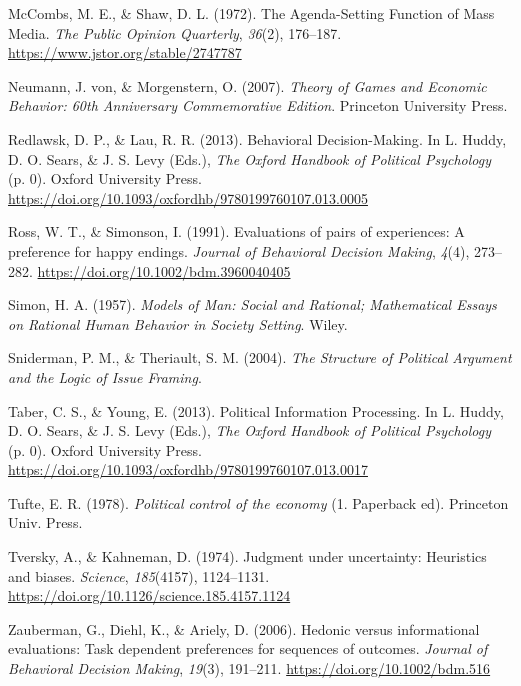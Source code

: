 \documentclass[
]{article}
\newlength{\cslhangindent}
\newlength{\cslentryspacingunit} %
\newenvironment{CSLReferences}[2] %
 {%
  \setlength{\parindent}{0pt}
  \ifodd #1
  \let\oldpar\par
  \def\par{\hangindent=\cslhangindent\oldpar}
  \fi
  \setlength{\parskip}{#2\cslentryspacingunit}
 }%
 {}
\begin{document}
\begin{CSLReferences}{1}{0}
\leavevmode{}%
McCombs, M. E., \& Shaw, D. L. (1972). The {Agenda-Setting Function} of
{Mass Media}. \emph{The Public Opinion Quarterly}, \emph{36}(2),
176--187. \url{https://www.jstor.org/stable/2747787}

\leavevmode{}%
Neumann, J. von, \& Morgenstern, O. (2007). \emph{Theory of {Games} and
{Economic Behavior}: 60th {Anniversary Commemorative Edition}}.
{Princeton University Press}.

\leavevmode{}%
Redlawsk, D. P., \& Lau, R. R. (2013). Behavioral {Decision-Making}. In
L. Huddy, D. O. Sears, \& J. S. Levy (Eds.), \emph{The {Oxford Handbook}
of {Political Psychology}} (p. 0). {Oxford University Press}.
\url{https://doi.org/10.1093/oxfordhb/9780199760107.013.0005}

\leavevmode{}%
Ross, W. T., \& Simonson, I. (1991). Evaluations of pairs of
experiences: {A} preference for happy endings. \emph{Journal of
Behavioral Decision Making}, \emph{4}(4), 273--282.
\url{https://doi.org/10.1002/bdm.3960040405}

\leavevmode{}%
Simon, H. A. (1957). \emph{Models of {Man}: {Social} and {Rational};
{Mathematical Essays} on {Rational Human Behavior} in {Society
Setting}}. {Wiley}.

\leavevmode{}%
Sniderman, P. M., \& Theriault, S. M. (2004). \emph{The {Structure} of
{Political Argument} and the {Logic} of {Issue Framing}}.

\leavevmode{}%
Taber, C. S., \& Young, E. (2013). Political {Information Processing}.
In L. Huddy, D. O. Sears, \& J. S. Levy (Eds.), \emph{The {Oxford
Handbook} of {Political Psychology}} (p. 0). {Oxford University Press}.
\url{https://doi.org/10.1093/oxfordhb/9780199760107.013.0017}

\leavevmode{}%
Tufte, E. R. (1978). \emph{Political control of the economy} (1.
Paperback ed). {Princeton Univ. Press}.

\leavevmode{}%
Tversky, A., \& Kahneman, D. (1974). Judgment under uncertainty:
{Heuristics} and biases. \emph{Science}, \emph{185}(4157), 1124--1131.
\url{https://doi.org/10.1126/science.185.4157.1124}

\leavevmode{}%
Zauberman, G., Diehl, K., \& Ariely, D. (2006). Hedonic versus
informational evaluations: Task dependent preferences for sequences of
outcomes. \emph{Journal of Behavioral Decision Making}, \emph{19}(3),
191--211. \url{https://doi.org/10.1002/bdm.516}

\end{CSLReferences}
\end{document}
